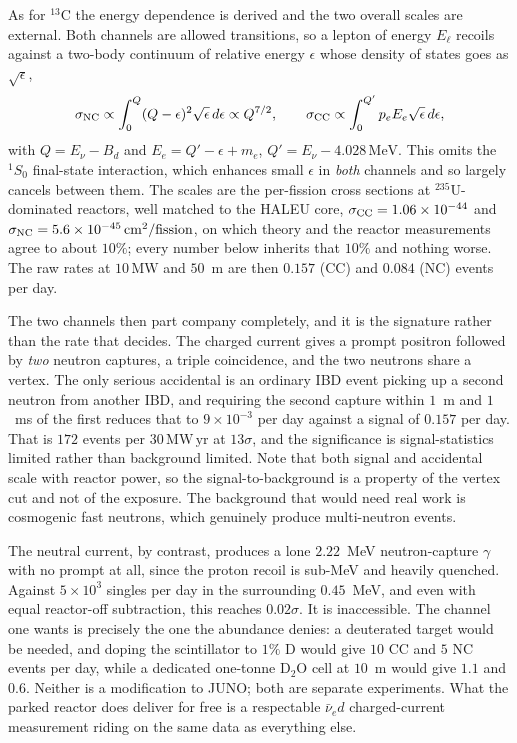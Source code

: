 \documentclass[aps,prd,superscriptaddress,nofootinbib,longbibliography,notitlepage,11pt]{revtex4-2}
\newcommand{\MWyr}{\mathrm{MW\,yr}}
\begin{document}
As for $^{13}$C the energy dependence is derived and the two overall scales are external.
Both channels are allowed transitions, so a lepton of energy $E_\ell$ recoils against a
two-body continuum of relative energy $\epsilon$ whose density of states goes as
$\sqrt\epsilon$,
\begin{equation}
\sigma_{\rm NC}\propto\int_0^{Q}(Q-\epsilon)^2\sqrt\epsilon\,d\epsilon\propto Q^{7/2},
\qquad
\sigma_{\rm CC}\propto\int_0^{Q'}p_eE_e\sqrt\epsilon\,d\epsilon,
\label{eq:dshapes}
\end{equation}
with $Q=E_\nu-B_d$ and $E_e=Q'-\epsilon+m_e$, $Q'=E_\nu-4.028\,\mathrm{MeV}$.  This omits
the $^1S_0$ final-state interaction, which enhances small $\epsilon$ in \emph{both}
channels and so largely cancels between them.  The scales are the per-fission cross
sections at $^{235}$U-dominated reactors, well matched to the HALEU core,
$\sigma_{\rm CC}=1.06\times10^{-44}$ and $\sigma_{\rm NC}=5.6\times10^{-45}\,
\mathrm{cm^2/fission}$, on which theory and the reactor measurements agree to about
$10\%$; every number below inherits that $10\%$ and nothing worse.  The raw rates at
$10\,\mathrm{MW}$ and $50$~m are then $0.157$ (CC) and $0.084$ (NC) events per day.

The two channels then part company completely, and it is the signature rather than the rate
that decides.  The charged current gives a prompt positron followed by \emph{two} neutron
captures, a triple coincidence, and the two neutrons share a vertex.  The only serious
accidental is an ordinary IBD event picking up a second neutron from another IBD, and
requiring the second capture within $1$~m and $1$~ms of the first reduces that to
$9\times10^{-3}$ per day against a signal of $0.157$ per day.  That is $172$ events
per $30\,\MWyr$ at $13\sigma$, and the significance is signal-statistics limited
rather than background limited.  Note that both signal and accidental scale with reactor
power, so the signal-to-background is a property of the vertex cut and not of the exposure.
The background that would need real work is cosmogenic fast neutrons, which genuinely
produce multi-neutron events.

The neutral current, by contrast, produces a lone $2.22$~MeV neutron-capture $\gamma$ with
no prompt at all, since the proton recoil is sub-MeV and heavily quenched.  Against
$5\times10^3$ singles per day in the surrounding $0.45$~MeV, and even with equal reactor-off
subtraction, this reaches $0.02\sigma$.  It is inaccessible.  The channel one wants is
precisely the one the abundance denies: a deuterated target would be needed, and doping the
scintillator to $1\%$ D would give $10$ CC and $5$ NC events per day, while a dedicated
one-tonne D$_2$O cell at $10$~m would give $1.1$ and $0.6$.  Neither is a modification to
JUNO; both are separate experiments.  What the parked reactor does deliver for free is a
respectable $\bar\nu_e d$ charged-current measurement riding on the same data as everything
else.
\end{document}
